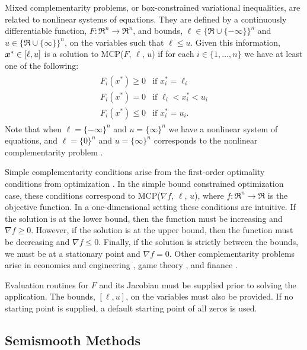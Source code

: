 Mixed complementarity problems, or box-constrained variational inequalities,
are related to nonlinear systems of equations.  They are defined by a 
continuously differentiable function,
$F:\Re^n \to \Re^n$, and bounds, $\ell \in \{\Re \cup \{-\infty\}\}^n$ 
and $u \in \{\Re \cup \{\infty\}\}^n$, on the variables such that 
$\ell \leq u$.  Given this information, $\mbox{\boldmath \(x\)}^* \in [\ell,u]$ is a solution to 
MCP($F$, $\ell$, $u$) if for each $i \in \{1, \ldots, n\}$ we have at
least one of the following:
\begin{eqnarray*}
\begin{array}{ll}
F_i(x^*) \geq 0 & \mbox{if } x^*_i = \ell_i \\
F_i(x^*) = 0 & \mbox{if } \ell_i < x^*_i < u_i \\
F_i(x^*) \leq 0 & \mbox{if } x^*_i = u_i.
\end{array}
\end{eqnarray*}
Note that when $\ell = \{-\infty\}^n$ and $u = \{\infty\}^n$ we have a 
nonlinear system of equations, and $\ell = \{0\}^n$ and $u = \{\infty\}^n$ 
corresponds to the nonlinear complementarity problem \cite{cottle:nonlinear}.

Simple complementarity conditions arise from the first-order optimality 
conditions from optimization \cite{karush:minima, kuhn.tucker:nonlinear}.  
In the simple bound constrained optimization case, these conditions 
correspond to MCP($\nabla f$, $\ell$, $u$), where $f: \Re^n \to \Re$ 
is the objective function.  In a one-dimensional setting these conditions 
are intuitive.  If the solution is at the lower bound, then the function must 
be increasing and $\nabla f \geq 0$.  However, if the solution is at the 
upper bound, then the function must be decreasing and $\nabla f \leq 0$.  
Finally, if the solution 
is strictly between the bounds, we must be at a stationary point and 
$\nabla f = 0$.  Other complementarity problems arise in economics and 
engineering \cite{ferris.pang:engineering}, game 
theory \cite{nash:equilibrium}, and finance \cite{huang.pang:option}.

Evaluation routines for $F$ and its Jacobian must be supplied prior
to solving the application.
The bounds, $[\ell,u]$, on the variables must also be 
provided.  
If no starting point is supplied, a default starting point of all zeros 
is used.

\subsection{Semismooth Methods}


